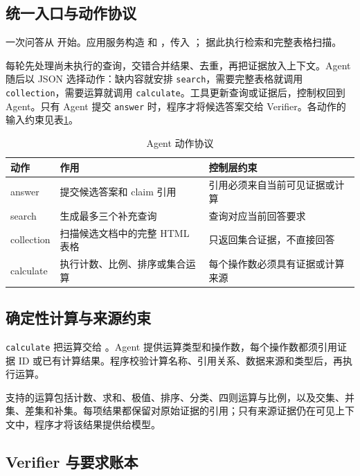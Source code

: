 \documentclass[UTF8,zihao=-4,fontset=fandol]{ctexart}
\newcommand{\code}[1]{\texttt{#1}}
\begin{document}
\subsection{统一入口与动作协议}

一次问答从  开始。应用服务构造  和 ，传入 ； 据此执行检索和完整表格扫描。

每轮先处理尚未执行的查询，交错合并结果、去重，再把证据放入上下文。Agent 随后以 JSON 选择动作：缺内容就安排 \code{search}，需要完整表格就调用 \code{collection}，需要运算就调用 \code{calculate}。工具更新查询或证据后，控制权回到 Agent。只有 Agent 提交 \code{answer} 时，程序才将候选答案交给 Verifier。各动作的输入约束见表\ref{tab:agent-actions}。

\begin{table}[H]
\centering
\caption{Agent 动作协议}
\label{tab:agent-actions}
\begin{tabularx}{\textwidth}{>{\ttfamily}p{2.6cm}X X}
\toprule
\normalfont 动作 & 作用 & 控制层约束 \\
\midrule
answer & 提交候选答案和 claim 引用 & 引用必须来自当前可见证据或计算 \\
search & 生成最多三个补充查询 & 查询对应当前回答要求 \\
collection & 扫描候选文档中的完整 HTML 表格 & 只返回集合证据，不直接回答 \\
calculate & 执行计数、比例、排序或集合运算 & 每个操作数必须具有证据或计算来源 \\
\bottomrule
\end{tabularx}
\end{table}

\subsection{确定性计算与来源约束}

\code{calculate} 把运算交给 。Agent 提供运算类型和操作数，每个操作数都须引用证据 ID 或已有计算结果。程序校验计算名称、引用关系、数据来源和类型后，再执行运算。

支持的运算包括计数、求和、极值、排序、分类、四则运算与比例，以及交集、并集、差集和补集。每项结果都保留对原始证据的引用；只有来源证据仍在可见上下文中，程序才将该结果提供给模型。

\subsection{Verifier 与要求账本}
\end{document}
